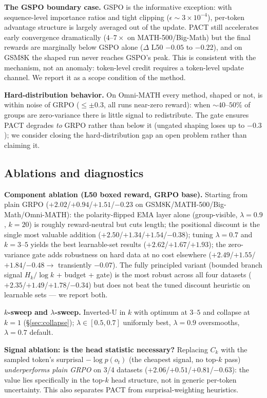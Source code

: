 \documentclass{article} %
\theoremstyle{plain}
\theoremstyle{definition}
\theoremstyle{remark}
\newcommand{\method}{PACT}
\begin{document}
\textbf{The GSPO boundary case.} GSPO is the informative exception: with sequence-level importance ratios and tight clipping ($\epsilon\sim3{\times}10^{-4}$), per-token advantage structure is largely averaged out of the update. \method{} still accelerates early convergence dramatically ($4$--$7\times$ on MATH-500/Big-Math) but the final rewards are marginally below GSPO alone ($\Delta$ L50 $-0.05$ to $-0.22$), and on GSM8K the shaped run never reaches GSPO's peak. This is consistent with the mechanism, not an anomaly: token-level credit requires a token-level update channel. We report it as a scope condition of the method.

\textbf{Hard-distribution behavior.} On Omni-MATH every method, shaped or not, is within noise of GRPO ($\le\pm0.3$, all runs near-zero reward): when ${\sim}40$--$50\%$ of groups are zero-variance there is little signal to redistribute. The gate ensures \method{} degrades \emph{to} GRPO rather than below it (ungated shaping loses up to $-0.3$); we consider closing the hard-distribution gap an open problem rather than claiming it.

\subsection{Ablations and diagnostics}
\label{sec:ablations}

\textbf{Component ablation (L50 boxed reward, GRPO base).} Starting from plain GRPO ($+2.02$/$+0.94$/$+1.51$/$-0.23$ on GSM8K/MATH-500/Big-Math/Omni-MATH): the polarity-flipped EMA layer alone (group-visible, $\lambda{=}0.9$, $k{=}20$) is roughly reward-neutral but cuts length; the positional discount is the single most valuable addition ($+2.50$/$+1.34$/$+1.54$/$-0.38$); tuning $\lambda{=}0.7$ and $k{=}3$--$5$ yields the best learnable-set results ($+2.62$/$+1.67$/$+1.93$); the zero-variance gate adds robustness on hard data at no cost elsewhere ($+2.49$/$+1.55$/$+1.84$/$-0.48\to$ transiently $-0.07$). The fully principled variant (bounded branch signal $H_k/\log k$ + budget + gate) is the most robust across all four datasets ($+2.35$/$+1.49$/$+1.78$/$-0.34$) but does not beat the tuned discount heuristic on learnable sets --- we report both.

\textbf{$k$-sweep and $\lambda$-sweep.} Inverted-U in $k$ with optimum at $3$--$5$ and collapse at $k{=}1$ (\S\ref{sec:collapse}); $\lambda\in[0.5,0.7]$ uniformly best, $\lambda{=}0.9$ oversmooths, $\lambda{=}0.7$ default.

\textbf{Signal ablation: is the head statistic necessary?} Replacing $C_k$ with the sampled token's surprisal $-\log p(o_t)$ (the cheapest signal, no top-$k$ pass) \emph{underperforms plain GRPO} on 3/4 datasets ($+2.06$/$+0.51$/$+0.81$/$-0.63$): the value lies specifically in the top-$k$ head structure, not in generic per-token uncertainty. This also separates \method{} from surprisal-weighting heuristics.
\end{document}
